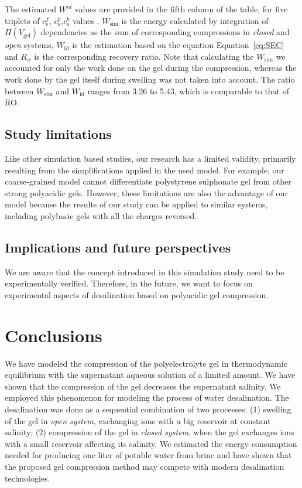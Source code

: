 \documentclass[journal,article,submit,pdftex,moreauthors]{Definitions/mdpi}
\newcommand{\cs}{c_{\mathrm{s}}}
\newcommand{\Vgel}{V_\mathrm{gel}}
\newcommand{\Pgel}{\Pi}
\newcommand{\refeq}[1]{Equation~\ref{#1}{}}
\begin{document}
The estimated $W^{id}$ values are provided in the fifth column of the table, for five triplets of $\cs^f$, $\cs^p$,$\cs^b$ values .
$W_{\mathrm{sim}}$ is the energy calculated by integration of $\Pgel(\Vgel)$ dependencies as the sum of corresponding compressions in \emph{closed} and \emph{open} systems, $W_{\mathrm{id}}$ is the estimation based on the equation \refeq{eq:SEC} and $R_w$ is the corresponding recovery ratio.
Note that calculating the $W_{\mathrm{sim}}$ we accounted for only the work done on the gel during the compression, whereas the work done by the gel itself during swelling was not taken into account.
The ratio between $W_{\mathrm{sim}}$ and $W_{\mathrm{id}}$ ranges from 3.26 to 5.43, which is comparable to that of RO.

\subsection{Study limitations}
Like other simulation based studies, our research has a limited validity,
primarily resulting from the simplifications applied in the used model.
For example, our coarse-grained model cannot differentiate polystyrene sulphonate gel from other strong polyacidic gels.
However, these limitations are also the advantage of our model because the results of our study
can be applied to similar systems, including polybasic gels with all the charges reversed.

\subsection{Implications and future perspectives}
We are aware that the concept introduced in this simulation study need to be experimentally verified.
Therefore, in the future, we want to focus on experimental aspects of desalination based on polyacidic gel compression. 

\section{Conclusions}
We have modeled the compression of the polyelectrolyte gel in thermodynamic equilibrium with the supernatant aqueous solution of a limited amount.
We have shown that the compression of the gel decreases the supernatant salinity.
We employed this phenomenon for modeling the process of water desalination.
The desalination was done as a sequential combination of two processes:
(1) swelling of the gel in \emph{open system}, exchanging ions with a big reservoir at constant salinity;
(2) compression of the gel in \emph{closed system}, when the gel exchanges ions with a small reservoir affecting its salinity.
We estimated the energy consumption needed for producing one liter of potable water from brine and have shown that the proposed gel compression method may compete with modern desalination technologies.
\end{document}
